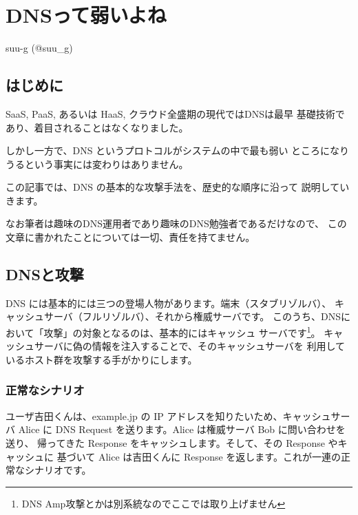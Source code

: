 
\chapter{DNSって弱いよね}

\begin{flushright}
 {\headfont suu-g (@suu\_g)}
\end{flushright}

\section{はじめに}


SaaS, PaaS, あるいは HaaS, クラウド全盛期の現代ではDNSは最早
基礎技術であり、着目されることはなくなりました。

しかし一方で、DNS というプロトコルがシステムの中で最も弱い
ところになりうるという事実には変わりはありません。

この記事では、DNS の基本的な攻撃手法を、歴史的な順序に沿って
説明していきます。

なお筆者は趣味のDNS運用者であり趣味のDNS勉強者であるだけなので、
この文章に書かれたことについては一切、責任を持てません。

\section{DNSと攻撃}

DNS には基本的には三つの登場人物があります。端末（スタブリゾルバ）、
キャッシュサーバ（フルリゾルバ）、それから権威サーバです。
このうち、DNSにおいて「攻撃」の対象となるのは、基本的にはキャッシュ
サーバです\footnote{DNS Amp攻撃とかは別系統なのでここでは取り上げません}。
キャッシュサーバに偽の情報を注入することで、そのキャッシュサーバを
利用しているホスト群を攻撃する手がかりにします。

\subsection{正常なシナリオ}
ユーザ吉田くんは、example.jp の IP アドレスを知りたいため、キャッシュサーバ
Alice に DNS Request を送ります。Alice は権威サーバ Bob に問い合わせを送り、
帰ってきた Response をキャッシュします。そして、その Response やキャッシュに
基づいて Alice は吉田くんに Response を返します。これが一連の正常なシナリオです。


